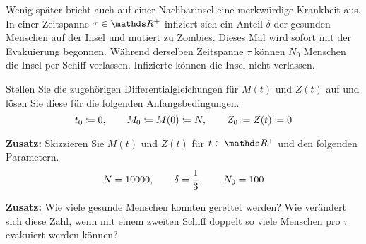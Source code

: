\begin{atiTask}[
	title = Ein Ausweg aus der Zombieapokalypse
]
	Wenig später bricht auch auf einer Nachbarinsel eine merkwürdige Krankheit aus.
	In einer  Zeitspanne $\tau\in\setR^+$ infiziert sich ein Anteil $\delta$ der gesunden Menschen auf der Insel und mutiert zu Zombies.
	Dieses Mal wird sofort mit der Evakuierung begonnen.
	Während derselben Zeitspanne $\tau$ können $N_0$ Menschen die Insel per Schiff verlassen.
	Infizierte können die Insel nicht verlassen.
	\begin{atiSubtasks}
		\item{
			Stellen Sie die zugehörigen Differentialgleichungen für $M(t)$ und $Z(t)$ auf und lösen Sie diese für die folgenden Anfangsbedingungen.
			\[
				t_0 \coloneqq 0 ,\qquad M_0\coloneqq M(0)\coloneqq N ,\qquad Z_0\coloneqq Z(t) \coloneqq 0
			\]
		}
		\item{
			\textbf{Zusatz:} Skizzieren Sie $M(t)$ und $Z(t)$ für $t\in\setR^+$ und den folgenden Parametern.
			\[
				N = 10000,\qquad \delta = \frac{1}{3} ,\qquad N_0 = 100
			\]
		}
		\item{
			\textbf{Zusatz:} Wie viele gesunde Menschen konnten gerettet werden? Wie verändert sich diese Zahl, wenn mit einem zweiten Schiff doppelt so viele Menschen pro $\tau$ evakuiert werden können?
		}
	\end{atiSubtasks}
\end{atiTask}